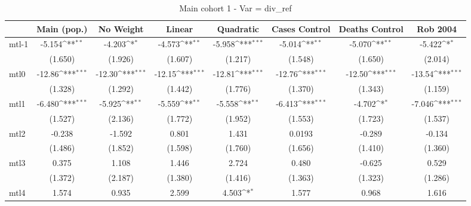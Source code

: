 \documentclass{article}
\begin{document}
{
\def\sym#1{\ifmmode^{#1}\else\(^{#1}\)\fi}
\begin{longtable}{l*{7}{c}}
\caption{Main cohort 1 - Var = div\_ref}\\
\hline\hline\endfirsthead\hline\endhead\hline\endfoot\endlastfoot
                &\multicolumn{1}{c}{Main (pop.)}&\multicolumn{1}{c}{No Weight}&\multicolumn{1}{c}{Linear}&\multicolumn{1}{c}{Quadratic}&\multicolumn{1}{c}{Cases Control}&\multicolumn{1}{c}{Deaths Control}&\multicolumn{1}{c}{Rob 2004}\\
\hline
mtl-1           &   -5.154\sym{**} &   -4.203\sym{*}  &   -4.573\sym{**} &   -5.958\sym{***}&   -5.014\sym{**} &   -5.070\sym{**} &   -5.422\sym{*}  \\
                &  (1.650)         &  (1.926)         &  (1.607)         &  (1.217)         &  (1.548)         &  (1.650)         &  (2.014)         \\
mtl0            &   -12.86\sym{***}&   -12.30\sym{***}&   -12.15\sym{***}&   -12.81\sym{***}&   -12.76\sym{***}&   -12.50\sym{***}&   -13.54\sym{***}\\
                &  (1.328)         &  (1.292)         &  (1.442)         &  (1.776)         &  (1.370)         &  (1.343)         &  (1.159)         \\
mtl1            &   -6.480\sym{***}&   -5.925\sym{**} &   -5.559\sym{**} &   -5.558\sym{**} &   -6.413\sym{***}&   -4.702\sym{*}  &   -7.046\sym{***}\\
                &  (1.527)         &  (2.136)         &  (1.772)         &  (1.952)         &  (1.553)         &  (1.723)         &  (1.537)         \\
mtl2            &   -0.238         &   -1.592         &    0.801         &    1.431         &   0.0193         &   -0.289         &   -0.134         \\
                &  (1.486)         &  (1.852)         &  (1.598)         &  (1.760)         &  (1.656)         &  (1.410)         &  (1.360)         \\
mtl3            &    0.375         &    1.108         &    1.446         &    2.724         &    0.480         &   -0.625         &    0.529         \\
                &  (1.372)         &  (2.187)         &  (1.380)         &  (1.416)         &  (1.363)         &  (1.323)         &  (1.286)         \\
mtl4            &    1.574         &    0.935         &    2.599         &    4.503\sym{*}  &    1.577         &    0.968         &    1.616         \\

\end{longtable}}
\end{document}
